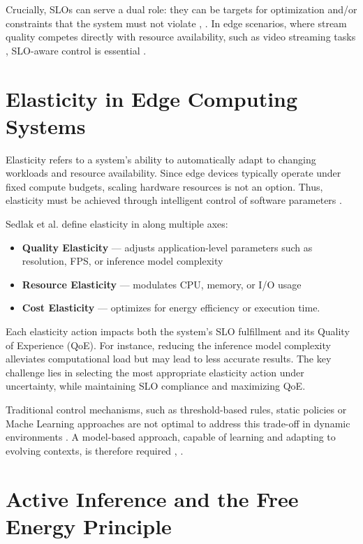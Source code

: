 Crucially, SLOs can serve a dual role: they can be targets for optimization and/or constraints that the
system must not violate \cite{casamayor_pujol_deepslos_2024}, \cite{sedlak_diffusing_2024}. In edge scenarios, where stream quality competes directly with resource availability, such as video streaming tasks \cite{sedlak_adaptive_2024}, SLO-aware control is essential \cite{sedlak_slo-aware_2025}.

\section{Elasticity in Edge Computing Systems}
Elasticity refers to a system’s ability to automatically adapt to changing workloads and resource availability. Since edge devices typically operate under fixed compute budgets, scaling hardware resources is not an option. Thus, elasticity must be achieved through intelligent control of software parameters \cite{sedlak_towards_2025}.

Sedlak et al. define elasticity in \cite{sedlak_towards_2025} along multiple axes:
\begin{itemize}
  \item \textbf{Quality Elasticity} — adjusts application-level parameters such as resolution, FPS,
or inference model complexity
  \item \textbf{Resource Elasticity} — modulates CPU, memory, or I/O usage
  \item \textbf{Cost Elasticity} — optimizes for energy efficiency or execution time.
\end{itemize}

Each elasticity action impacts both the system's SLO fulfillment and its Quality of Experience
(QoE). For instance, reducing the inference model complexity alleviates computational load but may lead to less accurate results. The key challenge lies in selecting the most appropriate elasticity action under uncertainty, while maintaining SLO compliance and maximizing QoE.

Traditional control mechanisms, such as threshold-based rules, static policies or Mache Learning approaches are not optimal to address this trade-off in dynamic environments \cite{sedlak_active_2024}. A model-based approach, capable of learning and adapting to evolving contexts, is therefore required \cite{sedlak_equilibrium_2024}, \cite{danilenka_adaptive_2025}.

\section{Active Inference and the Free Energy Principle}
